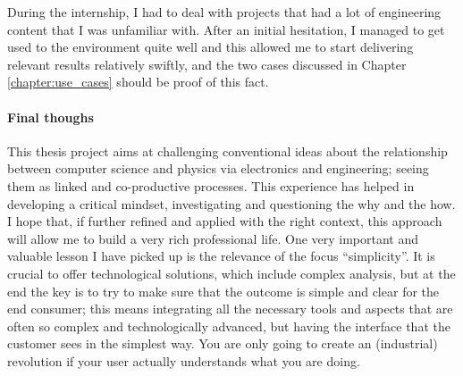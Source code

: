 During the internship, I had to deal with projects that had a lot of engineering content that I was unfamiliar with. 
After an initial hesitation, I managed to get used to the environment quite well and this allowed me to start delivering relevant results relatively swiftly, 
and the two cases discussed in Chapter \ref{chapter:use_cases} should be proof of this fact.

\paragraph{Final thoughs}
This thesis project aims at challenging conventional ideas about the relationship between computer science and physics via electronics and engineering; seeing them as linked and co-productive processes. 
This experience has helped in developing a critical mindset, investigating and questioning the why and the how. I hope that, if further refined and applied with the right context, this approach will allow me to build a very rich professional life.
One very important and valuable lesson I have picked up is the relevance of the focus ``simplicity''. It is crucial to offer technological solutions, which include complex analysis, but at the end the key is to try to make sure that the outcome is simple and clear for the end consumer; 
this means integrating all the necessary tools and aspects that are often so complex and technologically advanced, but having the interface that the customer sees in the simplest way. 
You are only going to create an (industrial) revolution if your user actually understands what you are doing.
